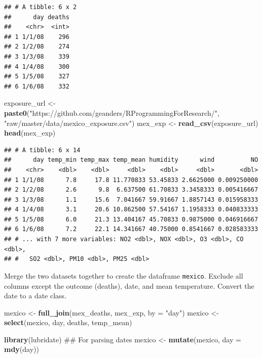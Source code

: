 \documentclass[]{book}
\makeatletter
\newenvironment{Shaded}{\begin{snugshade}}{\end{snugshade}}
\newcommand{\KeywordTok}[1]{\textcolor[rgb]{0.13,0.29,0.53}{\textbf{#1}}}
\newcommand{\DataTypeTok}[1]{\textcolor[rgb]{0.13,0.29,0.53}{#1}}
\newcommand{\StringTok}[1]{\textcolor[rgb]{0.31,0.60,0.02}{#1}}
\newcommand{\NormalTok}[1]{#1}
\newenvironment{kframe}{%
\medskip{}
\setlength{\fboxsep}{.8em}
 \def\at@end@of@kframe{}%
 \ifinner\ifhmode%
  \def\at@end@of@kframe{\end{minipage}}%
  \begin{minipage}{\columnwidth}%
 \fi\fi%
 \def\FrameCommand##1{\hskip\@totalleftmargin \hskip-\fboxsep
 \colorbox{shadecolor}{##1}\hskip-\fboxsep
     \hskip-\linewidth \hskip-\@totalleftmargin \hskip\columnwidth}%
 \MakeFramed {\advance\hsize-\width
   \@totalleftmargin\z@ \linewidth\hsize
   \@setminipage}}%
 {\par\unskip\endMakeFramed%
 \at@end@of@kframe}
\renewenvironment{Shaded}{\begin{kframe}}{\end{kframe}}
\theoremstyle{definition}
\theoremstyle{definition}
\theoremstyle{definition}
\theoremstyle{remark}
\makeatother
\begin{document}
\begin{verbatim}
## # A tibble: 6 x 2
##      day deaths
##    <chr>  <int>
## 1 1/1/08    296
## 2 1/2/08    274
## 3 1/3/08    339
## 4 1/4/08    300
## 5 1/5/08    327
## 6 1/6/08    332
\end{verbatim}

\begin{Shaded}
\begin{Highlighting}[]
\NormalTok{exposure_url <-}\StringTok{ }\KeywordTok{paste0}\NormalTok{(}\StringTok{"https://github.com/geanders/RProgrammingForResearch/"}\NormalTok{,}
                       \StringTok{"raw/master/data/mexico_exposure.csv"}\NormalTok{)}
\NormalTok{mex_exp <-}\StringTok{ }\KeywordTok{read_csv}\NormalTok{(exposure_url)}
\KeywordTok{head}\NormalTok{(mex_exp)}
\end{Highlighting}
\end{Shaded}

\begin{verbatim}
## # A tibble: 6 x 14
##      day temp_min temp_max temp_mean humidity      wind          NO
##    <chr>    <dbl>    <dbl>     <dbl>    <dbl>     <dbl>       <dbl>
## 1 1/1/08      7.8     17.8 11.770833 53.45833 2.6625000 0.009250000
## 2 1/2/08      2.6      9.8  6.637500 61.70833 3.3458333 0.005416667
## 3 1/3/08      1.1     15.6  7.041667 59.91667 1.8857143 0.015958333
## 4 1/4/08      3.1     20.6 10.862500 57.54167 1.1958333 0.040833333
## 5 1/5/08      6.0     21.3 13.404167 45.70833 0.9875000 0.046916667
## 6 1/6/08      7.2     22.1 14.341667 40.75000 0.8541667 0.028583333
## # ... with 7 more variables: NO2 <dbl>, NOX <dbl>, O3 <dbl>, CO <dbl>,
## #   SO2 <dbl>, PM10 <dbl>, PM25 <dbl>
\end{verbatim}

Merge the two datasets together to create the dataframe \texttt{mexico}.
Exclude all columns except the outcome (deaths), date, and mean
temperature. Convert the date to a date class.

\begin{Shaded}
\begin{Highlighting}[]
\NormalTok{mexico <-}\StringTok{ }\KeywordTok{full_join}\NormalTok{(mex_deaths, mex_exp, }\DataTypeTok{by =} \StringTok{"day"}\NormalTok{) }
\NormalTok{mexico <-}\StringTok{ }\KeywordTok{select}\NormalTok{(mexico, day, deaths, temp_mean)}

\KeywordTok{library}\NormalTok{(lubridate) ## For parsing dates}
\NormalTok{mexico <-}\StringTok{ }\KeywordTok{mutate}\NormalTok{(mexico, }\DataTypeTok{day =} \KeywordTok{mdy}\NormalTok{(day))}
\end{Highlighting}
\end{Shaded}
\end{document}
